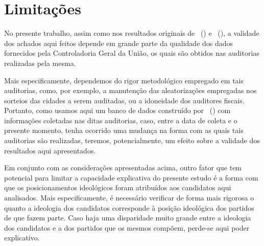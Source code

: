 \documentclass[
	12pt,				%
	openright,			%
	twoside,			%
	a4paper,			%
	openany,
	english,			%
	brazil				%
	]{abntex2}
\begin{document}

	

			

\section{Limitações}

No presente trabalho, assim como nos resultados originais de ~(\citeyear{ferraz2008exposing}) e ~(\citeyear{Avis2018Oct}), a validade dos achados aqui feitos depende em grande parte da qualidade dos dados fornecidos pela Controladoria Geral da União, os quais são obtidos nas auditorias realizadas pela mesma.

Mais especificamente, dependemos do rigor metodológico empregado em tais auditorias, como, por exemplo, a manutenção das aleatorizações empregadas nos sorteios das cidades a serem auditadas, ou a idoneidade dos auditores fiscais. Portanto, como usamos aqui um banco de dados construído por ~(\citeyear{Brollo2013Aug}) com informações coletadas nas ditas auditorias, caso, entre a data de coleta e o presente momento, tenha ocorrido uma mudança na forma com as quais tais auditorias são realizadas, teremos, potencialmente, um efeito sobre a validade dos resultados aqui apresentados. %

Em conjunto com as considerações apresentadas acima, outro fator que tem potencial para limitar a capacidade explicativa do presente estudo é a forma com que os posicionamentos ideológicos foram atribuídos aos candidatos aqui analisados. Mais especificamente, é necessário verificar de forma mais rigorosa o quanto a ideologia dos candidatos corresponde à posição ideológica dos partidos de que fazem parte. Caso haja uma disparidade muito grande entre a ideologia dos candidatos e a dos partidos que os mesmos compõem, perde-se aqui poder explicativo.
\end{document}
